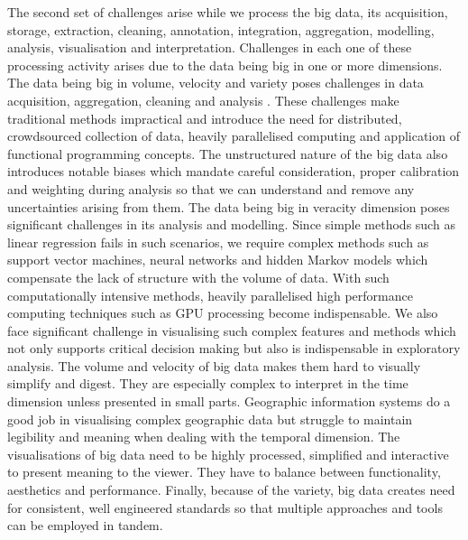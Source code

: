 The second set of challenges arise while we process the big data, its acquisition, storage, extraction, cleaning, annotation, integration, aggregation, modelling, analysis, visualisation and interpretation.
Challenges in each one of these processing activity arises due to the data being big in one or more dimensions.
The data being big in volume, velocity and variety poses challenges in data acquisition, aggregation, cleaning and analysis \cite{li2016}. 
These challenges make traditional methods impractical and introduce the need for distributed, crowdsourced collection of data, heavily parallelised computing and application of functional programming concepts.
The unstructured nature of the big data also introduces notable biases which mandate careful consideration, proper calibration and weighting during analysis so that we can understand and remove any uncertainties arising from them.
The data being big in veracity dimension poses significant challenges in its analysis and modelling.
Since simple methods such as linear regression fails in such scenarios, we require complex methods such as support vector machines, neural networks and hidden Markov models which compensate the lack of structure with the volume of data.
With such computationally intensive methods, heavily parallelised high performance computing techniques such as GPU processing become indispensable.
We also face significant challenge in visualising such complex features and methods which not only supports critical decision making but also is indispensable in exploratory analysis.
The volume and velocity of big data makes them hard to visually simplify and digest.
They are especially complex to interpret in the time dimension unless presented in small parts.
Geographic information systems do a good job in visualising complex geographic data but struggle to maintain legibility and meaning when dealing with the temporal dimension.
The visualisations of big data need to be highly processed, simplified and interactive to present meaning to the viewer. 
They have to balance between functionality, aesthetics and performance.
Finally, because of the variety, big data creates need for consistent, well engineered standards so that multiple approaches and tools can be employed in tandem.


